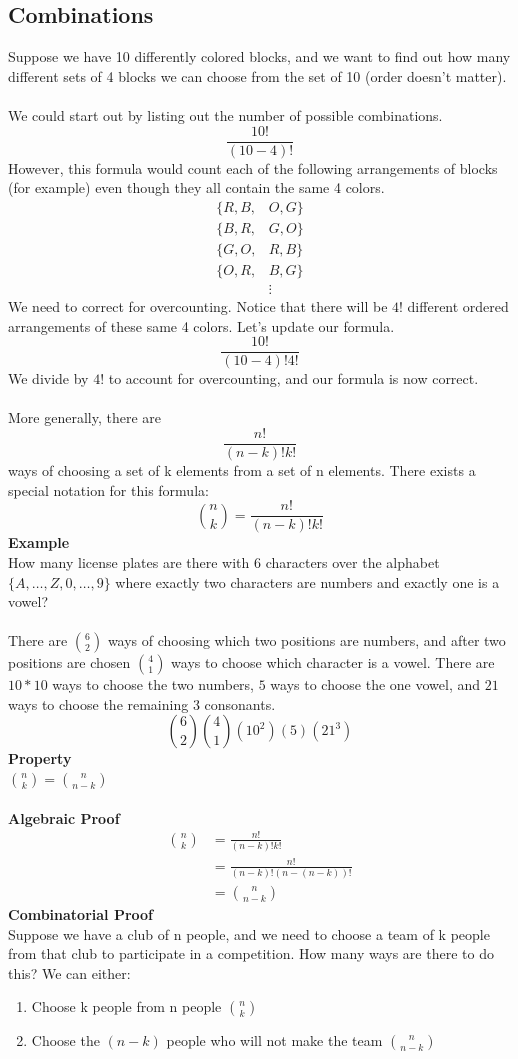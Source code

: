 \documentclass[12pt]{article}
\begin{document}
	\subsection{Combinations}
	Suppose we have 10 differently colored blocks, and we want to find out how many different sets of 4 blocks we can choose from the set of 10 (order doesn't matter).\\\\
	We could start out by listing out the number of possible combinations.
	$$ \frac{10!}{(10 - 4)!} $$
	However, this formula would count each of the following arrangements of blocks (for example) even though they all contain the same 4 colors.
	\begin{align*}
		\{R, B,& O, G\}\\
		\{B, R,& G, O\}\\
		\{G, O,& R, B\}\\
		\{O, R,& B, G\}\\
			   &\vdots
	\end{align*}
	We need to correct for overcounting. Notice that there will be $4!$ different ordered arrangements of these same 4 colors. Let's update our formula.
	$$\frac{10!}{(10 - 4)!4!}$$
	We divide by $4!$ to account for overcounting, and our formula is now correct.\\\\
	More generally, there are $$\frac{n!}{(n - k)!k!}$$ ways of choosing a set of k elements from a set of n elements. There exists a special notation for this formula:
	$${n \choose k} = \frac{n!}{(n - k)! k!}$$
	\textbf{Example}\\
	How many license plates are there with 6 characters over the alphabet $\{A, \ldots, Z, 0, \ldots, 9\}$ where exactly two characters are numbers and exactly one is a vowel?\\\\
	There are ${6 \choose 2}$ ways of choosing which two positions are numbers, and after two positions are chosen ${4 \choose 1}$ ways to choose which character is a vowel. There are $10*10$ ways to choose the two numbers, $5$ ways to choose the one vowel, and $21$ ways to choose the remaining 3 consonants.
	$${6 \choose 2}{4 \choose 1}(10^2)(5)(21^3)$$
	\textbf{Property}\\
	${n \choose k} = {n \choose n - k}$\\\\
	\textbf{Algebraic Proof}
	\begin{align*}
		{n \choose k} &= \frac{n!}{(n - k)!k!}\\
					  &= \frac{n!}{(n-k)!(n - (n - k))!}\\
					  &= {n \choose n - k}
	\end{align*}
	\textbf{Combinatorial Proof}\\
	Suppose we have a club of n people, and we need to choose a team of k people from that club to participate in a competition. How many ways are there to do this? We can either:
	\begin{enumerate}
		\item Choose k people from n people ${n \choose k}$
		\item Choose the $(n - k)$ people who will not make the team ${n \choose n - k}$
	\end{enumerate}
\end{document}
